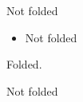 \documentclass{minimal}
\begin{document}
\begin{blacklist}
  Not folded

  \begin{itemize}
    \item Not folded
  \end{itemize}

  \begin{whitelist}
    Folded.
  \end{whitelist}

  \begin{both}
    Not folded
  \end{both}
\end{blacklist}
\end{document}
